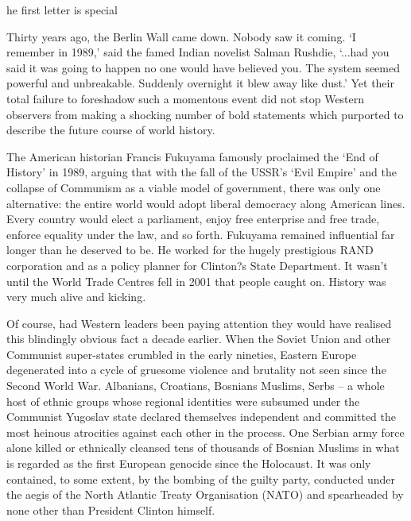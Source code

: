 \label{ch:suddenly-it-blew-away-like-dust}

he first letter is special



   Thirty years ago, the Berlin Wall came down. Nobody saw it coming. `I
   remember in 1989,' said the famed Indian novelist Salman Rushdie,
   `...had you said it was going to happen no one would have believed you.
   The system seemed powerful and unbreakable. Suddenly overnight it blew
   away like dust.' Yet their total failure to foreshadow such a momentous
   event did not stop Western observers from making a shocking number of
   bold statements which purported to describe the future course of world
   history.

   The American historian Francis Fukuyama famously proclaimed the `End of
   History' in 1989, arguing that with the fall of the USSR's `Evil
   Empire' and the collapse of Communism as a viable model of government,
   there was only one alternative: the entire world would adopt liberal
   democracy along American lines. Every country would elect a parliament,
   enjoy free enterprise and free trade, enforce equality under the law,
   and so forth. Fukuyama remained influential far longer than he deserved
   to be. He worked for the hugely prestigious RAND corporation and as a
   policy planner for Clinton?s State Department. It wasn't until the
   World Trade Centres fell in 2001 that people caught on. History was
   very much alive and kicking.

   Of course, had Western leaders been paying attention they would have
   realised this blindingly obvious fact a decade earlier. When the Soviet
   Union and other Communist super-states crumbled in the early nineties,
   Eastern Europe degenerated into a cycle of gruesome violence and
   brutality not seen since the Second World War. Albanians, Croatians,
   Bosnians Muslims, Serbs -- a whole host of ethnic groups whose regional
   identities were subsumed under the Communist Yugoslav state declared
   themselves independent and committed the most heinous atrocities
   against each other in the process. One Serbian army force alone killed
   or ethnically cleansed tens of thousands of Bosnian Muslims in what is
   regarded as the first European genocide since the Holocaust. It was
   only contained, to some extent, by the bombing of the guilty party,
   conducted under the aegis of the North Atlantic Treaty Organisation
   (NATO) and spearheaded by none other than President Clinton himself.

